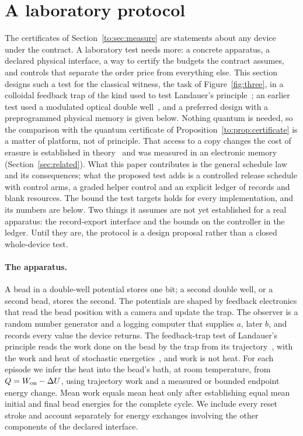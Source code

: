 \section{A laboratory protocol}\label{sec:protocol}

The certificates of Section~\ref{to:sec:measure} are statements about any device under the contract. A laboratory test needs more: a concrete apparatus, a declared physical interface, a way to certify the budgets the contract assumes, and controls that separate the order price from everything else. This section designs such a test for the classical witness, the task of Figure~\ref{fig:three}, in a colloidal feedback trap of the kind used to test Landauer's principle~\cite{Jun14}; an earlier test used a modulated optical double well~\cite{Berut12}, and a preferred design with a preprogrammed physical memory is given below. Nothing quantum is needed, so the comparison with the quantum certificate of Proposition~\ref{to:prop:certificate} is a matter of platform, not of principle. That access to a copy changes the cost of erasure is established in theory~\cite{Bennett73,Bennett03,delRio11} and was measured in an electronic memory~\cite{Orlov12} (Section~\ref{sec:related}). What this paper contributes is the general schedule law and its consequences; what the proposed test adds is a controlled release schedule with control arms, a graded helper control and an explicit ledger of records and blank resources. The bound the test targets holds for every implementation, and its numbers are below. Two things it assumes are not yet established for a real apparatus: the record-export interface and the bounds on the controller in the ledger. Until they are, the protocol is a design proposal rather than a closed whole-device test.

\paragraph{The apparatus.} A bead in a double-well potential stores one bit; a second double well, or a second bead, stores the second. The potentials are shaped by feedback electronics that read the bead position with a camera and update the trap. The observer is a random number generator and a logging computer that supplies $a$, later $b$, and records every value the device returns. The feedback-trap test of Landauer's principle reads the work done on the bead by the trap from its trajectory~\cite{Jun14}, with the work and heat of stochastic energetics~\cite{Sekimoto98}, and work is not heat. For each episode we infer the heat into the bead's bath, at room temperature, from $Q=W_{\rm on}-\Delta U$, using trajectory work and a measured or bounded endpoint energy change. Mean work equals mean heat only after establishing equal mean initial and final bead energies for the complete cycle. We include every reset stroke and account separately for energy exchanges involving the other components of the declared interface.

